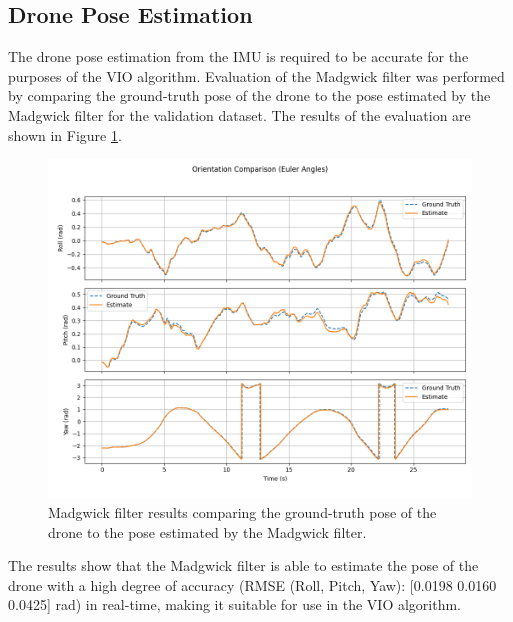 \documentclass[bare_jrnl_transmag]{subfiles}
\begin{document}
\subsection{Drone Pose Estimation}
The drone pose estimation from the IMU is required to be accurate for the purposes of the VIO algorithm. Evaluation of the Madgwick filter was performed by comparing the ground-truth pose of the drone to the pose estimated by the Madgwick filter for the validation dataset. The results of the evaluation are shown in Figure \ref{fig:madgwick_results}.

\begin{figure}[H]
    \centering
    \includegraphics[width=0.8\linewidth]{figures/madgwick_results.png}
    \caption{Madgwick filter results comparing the ground-truth pose of the drone to the pose estimated by the Madgwick filter.}
    \label{fig:madgwick_results}
\end{figure}

The results show that the Madgwick filter is able to estimate the pose of the drone with a high degree of accuracy (RMSE (Roll, Pitch, Yaw): [0.0198 0.0160 0.0425] rad) in real-time, making it suitable for use in the VIO algorithm.
\end{document}
